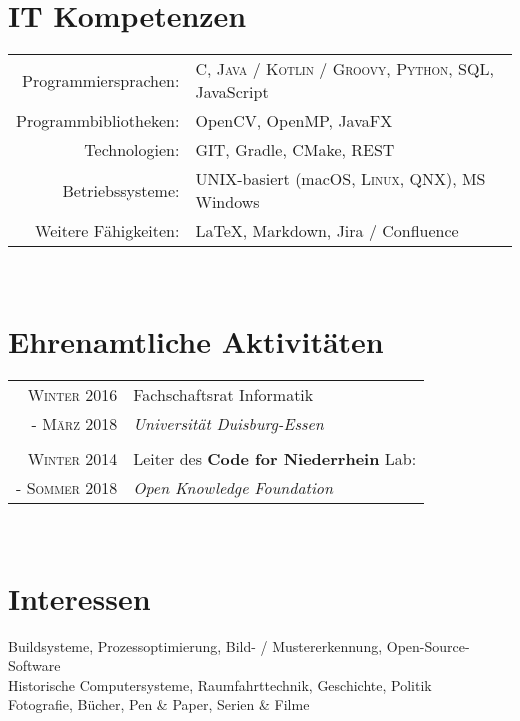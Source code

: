 \documentclass[10pt,a4paper]{article}
\begin{document}
\section{IT Kompetenzen}

\begin{tabular}{rl}
	Programmiersprachen:	& \textsc{C}, \textsc{Java / Kotlin / Groovy}, \textsc{Python}, SQL, JavaScript \\
	Programmbibliotheken:	& OpenCV, OpenMP, JavaFX \\
	Technologien:			& GIT, Gradle, CMake, REST \\
	Betriebssysteme:		& UNIX-basiert (macOS, \textsc{Linux}, \textsc{QNX}), MS Windows \\
	Weitere F\"ahigkeiten:	& {\fb \LaTeX}\setmainfont[SmallCapsFont=Fontin-SmallCaps.otf]{Fontin.otf}, Markdown, Jira / Confluence \\
\end{tabular} \\


\section{Ehrenamtliche Aktivit\"aten}

\begin{tabular}{rl}
	\textsc{Winter} 2016		& Fachschaftsrat Informatik \\
	- \textsc{M\"arz} 2018	& \emph{Universit\"at Duisburg-Essen} \\
	& \\
	
	\textsc{Winter} 2014		& Leiter des \textbf{Code for Niederrhein} Lab: \\
	- \textsc{Sommer} 2018	& \emph{Open Knowledge Foundation} \\
\end{tabular} \\


\section{Interessen}
Buildsysteme, Prozessoptimierung, Bild- / Mustererkennung, Open-Source-Software \\
Historische Computersysteme, Raumfahrttechnik, Geschichte, Politik \\
Fotografie, B\"ucher, Pen \& Paper, Serien \& Filme
\end{document}
